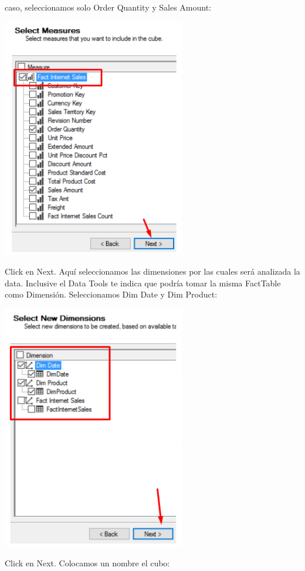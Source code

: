 caso, seleccionamos solo Order Quantity y Sales Amount:
	\begin{center}
	\includegraphics[width=8cm]{images/task3/img19}
	\end{center}	
Click en Next.
Aquí seleccionamos las dimensiones por las cuales será analizada la data. Inclusive el Data Tools te indica
que podría tomar la misma FactTable como Dimensión. Seleccionamos Dim Date y Dim Product:
	\begin{center}
	\includegraphics[width=8cm]{images/task3/img20}
	\end{center}	
Click en Next.
Colocamos un nombre el cubo:


